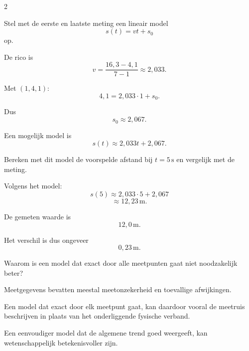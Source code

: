 \documentclass{ximera}
\begin{document}
\begin{oefening}{\oefG}
\begin{multicols}{2}
    
    \begin{question}
    Stel met de eerste en laatste meting een lineair model
    \[
    s(t)=vt+s_0
    \]
    op.
    
    \begin{oplossing}
    De rico is
    \[
    v
    =
    \frac{16{,}3-4{,}1}{7-1}
    \approx2{,}033.
    \]
    
    Met $(1,4{,}1)$:
    \[
    4{,}1
    =
    2{,}033\cdot1+s_0.
    \]
    
    Dus
    \[
    s_0\approx2{,}067.
    \]
    
    Een mogelijk model is
    \[
    \boxed{s(t)\approx2{,}033t+2{,}067}.
    \]
    \end{oplossing}
    \end{question}
    
    
    \begin{question}
    Bereken met dit model de voorspelde afstand bij $t=5\,\mathrm s$ en vergelijk met de meting.
    
    \begin{oplossing}
    Volgens het model:
    \[
    s(5)
    \approx2{,}033\cdot5+2{,}067
    \]
    \[
    \approx12{,}23\,\mathrm m.
    \]
    
    De gemeten waarde is
    \[
    12{,}0\,\mathrm m.
    \]
    
    Het verschil is dus ongeveer
    \[
    0{,}23\,\mathrm m.
    \]
    \end{oplossing}
    \end{question}
    
    
    \begin{question}
    Waarom is een model dat exact door alle meetpunten gaat niet noodzakelijk beter?
    
    \begin{oplossing}
    Meetgegevens bevatten meestal meetonzekerheid en toevallige afwijkingen.
    
    Een model dat exact door elk meetpunt gaat, kan daardoor vooral de meetruis beschrijven in plaats van het onderliggende fysische verband.
    
    Een eenvoudiger model dat de algemene trend goed weergeeft, kan wetenschappelijk betekenisvoller zijn.
    \end{oplossing}
    \end{question}
    
    \end{multicols}
    
    \end{oefening}
\end{document}
